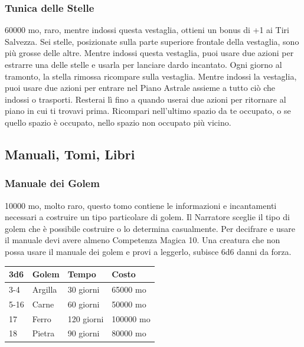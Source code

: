 \begin{multicols}{2}

\medskip

\subsubsection*{Tunica delle Stelle}
60000 mo, raro, mentre indossi questa vestaglia, ottieni un bonus di +1 ai Tiri Salvezza. Sei stelle, posizionate sulla parte superiore frontale della vestaglia, sono più grosse delle altre. Mentre indossi questa vestaglia, puoi usare due azioni per estrarre una delle stelle e usarla per lanciare dardo incantato. Ogni giorno al tramonto, la stella rimossa ricompare sulla vestaglia. Mentre indossi la vestaglia, puoi usare due azioni per entrare nel Piano Astrale assieme a tutto ciò che indossi o trasporti. Resterai lì fino a quando userai due azioni per ritornare al piano in cui ti trovavi prima. Ricompari nell'ultimo spazio da te occupato, o se quello spazio è occupato, nello spazio non occupato più vicino.

\subsection{Manuali, Tomi, Libri}


\subsubsection*{Manuale dei Golem}
10000 mo, molto raro, questo tomo contiene le informazioni e incantamenti necessari a costruire un tipo particolare di golem. Il Narratore sceglie il tipo di golem che è possibile costruire o lo determina casualmente. Per decifrare e usare il manuale devi avere almeno Competenza Magica 10. Una creatura che non possa usare il manuale dei golem e provi a leggerlo, subisce 6d6 danni da forza.

\medskip

\begin{tabular}{llll}
3d6 &Golem &Tempo &Costo\\
\hline
3-4 &Argilla &30 giorni &65000 mo\\
5-16 &Carne &60 giorni& 50000 mo\\
17 &Ferro &120 giorni &100000 mo\\
18 &Pietra& 90 giorni &80000 mo\\
\end{tabular}



\end{multicols}
